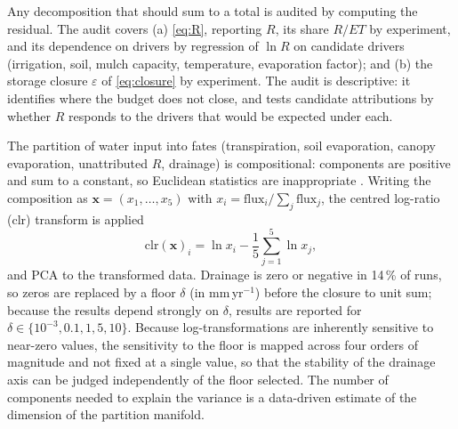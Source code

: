 \documentclass[preprint,12pt,authoryear]{elsarticle}
\begin{document}
Any decomposition that should sum to a total is audited by computing the residual. The audit covers (a) \cref{eq:R}, reporting $R$, its share $R/\mathit{ET}$ by experiment, and its dependence on drivers by regression of $\ln R$ on candidate drivers (irrigation, soil, mulch capacity, temperature, evaporation factor); and (b) the storage closure $\varepsilon$ of \cref{eq:closure} by experiment. The audit is descriptive: it identifies where the budget does not close, and tests candidate attributions by whether $R$ responds to the drivers that would be expected under each.

The partition of water input into fates (transpiration, soil evaporation, canopy evaporation, unattributed $R$, drainage) is compositional: components are positive and sum to a constant, so Euclidean statistics are inappropriate \citep{Aitchison1986,Egozcue2003}. Writing the composition as $\mathbf x=(x_1,\dots,x_5)$ with $x_i=\text{flux}_i/\sum_j\text{flux}_j$, the centred log-ratio (clr) transform is applied
\begin{equation}
\mathrm{clr}(\mathbf x)_i=\ln x_i-\frac1{5}\sum_{j=1}^5\ln x_j ,
\label{eq:clr}
\end{equation}
and PCA \citep{Wold1987} to the transformed data. Drainage is zero or negative in 14\,\% of runs, so zeros are replaced by a floor $\delta$ (in mm\,yr$^{-1}$) before the closure to unit sum; because the results depend strongly on $\delta$, results are reported for $\delta\in\{10^{-3},0.1,1,5,10\}$. Because log-transformations are inherently sensitive to near-zero values, the sensitivity to the floor is mapped across four orders of magnitude and not fixed at a single value, so that the stability of the drainage axis can be judged independently of the floor selected. The number of components needed to explain the variance is a data-driven estimate of the dimension of the partition manifold.
\end{document}
